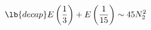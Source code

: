\begin{equation}
\lb{decap}
E\left(\frac{1}{3}\right)+E\left(\frac{1}{15}\right)\sim 45 N_2^{2}
\end{equation}

